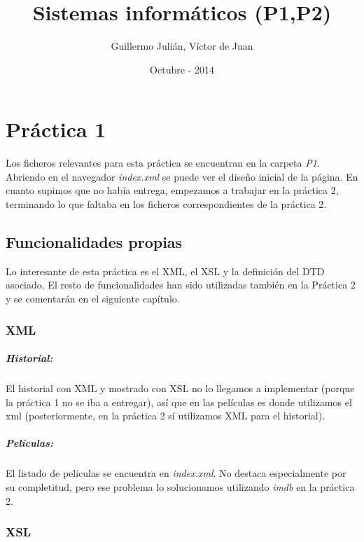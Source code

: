\documentclass{apuntes}
\title{Sistemas informáticos (P1,P2)}
\author{Guillermo Julián, Víctor de Juan}
\date{Octubre - 2014}
\begin{document}
\pagestyle{plain}
\maketitle

\tableofcontents
\newpage

\chapter{Práctica 1}

Los ficheros relevantes para esta práctica se encuentran en la carpeta \textit{P1}. Abriendo en el navegador \textit{index.xml} se puede ver el diseño inicial de la página. En cuanto supimos que no había entrega, empezamos a trabajar en la práctica 2, terminando lo que faltaba en los ficheros correspondientes de la práctica 2.

\section{Funcionalidades propias}
Lo interesante de esta práctica es el XML, el XSL y la definición del DTD asociado. El resto de funcionalidades han sido utilizadas también en la Práctica 2 y se comentarán en el siguiente capítulo.


\subsection{XML}

\paragraph{Historial: }
El historial con XML y mostrado con XSL no lo llegamos a implementar (porque la práctica 1 no se iba a entregar), así que en las películas es donde utilizamos el xml (posteriormente, en la práctica 2 sí utilizamos XML para el historial).

\paragraph{Películas: }
El listado de películas se encuentra en \textit{index.xml}. No destaca especialmente por su completitud, pero ese problema lo solucionamos utilizando \textit{imdb} en la práctica 2. 

\subsection{XSL} 
\end{document}
